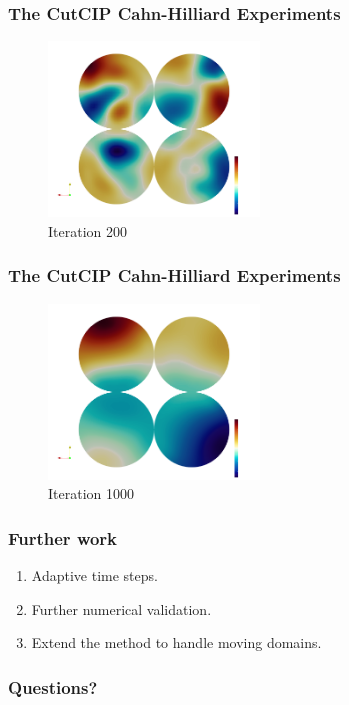 \begin{frame}
\frametitle{The CutCIP Cahn-Hilliard Experiments}
\begin{figure}[h]
    \centering
    \includegraphics[width=0.5\textwidth]{CH-example/200.png}
    \caption{Iteration 200}
\end{figure}
\end{frame}

\begin{frame}
\frametitle{The CutCIP Cahn-Hilliard Experiments}
\begin{figure}[h]
    \centering
    \includegraphics[width=0.5\textwidth]{CH-example/1000.png}
    \caption{Iteration 1000}
\end{figure}
\end{frame}


\begin{frame}
\frametitle{Further work}
\begin{enumerate}
    \item Adaptive time steps.
    \item Further numerical validation.
    \item Extend the method to handle moving domains.

\end{enumerate}
\end{frame}


\begin{frame}
\frametitle{Questions?}
\end{frame}


